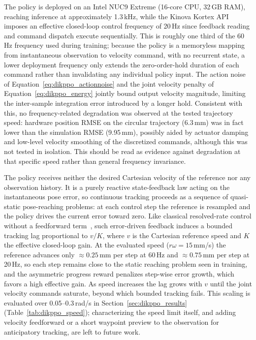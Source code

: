 The policy is deployed on an Intel NUC9 Extreme (16-core CPU, 32\,GB RAM), reaching inference at
approximately 1.3\,kHz, while the Kinova Kortex API imposes an effective closed-loop control
frequency of 20\,Hz since feedback reading and command dispatch execute sequentially. This is
roughly one third of the 60\,Hz frequency used during training; because the policy is a memoryless
mapping from instantaneous observation to velocity command, with no recurrent state, a lower
deployment frequency only extends the zero-order-hold duration of each command rather than
invalidating any individual policy input. The action noise of Equation~\eqref{eq:dikppo_actionnoise}
and the joint velocity penalty of Equation~\eqref{eq:dikppo_energy} jointly bound output velocity
magnitude, limiting the inter-sample integration error introduced by a longer hold. Consistent with
this, no frequency-related degradation was observed at the tested trajectory speed: hardware position
RMSE on the circular trajectory (6.3\,mm) was in fact lower than the simulation RMSE (9.95\,mm),
possibly aided by actuator damping and low-level velocity smoothing of the discretized commands,
although this was not tested in isolation. This should be read as evidence against degradation at
that specific speed rather than general frequency invariance.

The policy receives neither the desired Cartesian velocity of the reference nor any observation
history. It is a purely reactive state-feedback law acting on the instantaneous pose error, so
continuous tracking proceeds as a sequence of quasi-static pose-reaching problems: at each control
step the reference is resampled and the policy drives the current error toward zero. Like classical
resolved-rate control without a feedforward term~\citep{whitney1969resolved}, such error-driven
feedback induces a bounded tracking lag proportional to $v/K$, where $v$ is the Cartesian reference
speed and $K$ the effective closed-loop gain. At the evaluated speed ($r\omega = 15$\,mm/s) the
reference advances only $\approx 0.25$\,mm per step at 60\,Hz and $\approx 0.75$\,mm per step at
20\,Hz, so each step remains close to the static reaching problem seen in training, and the
asymmetric progress reward penalizes step-wise error growth, which favors a high effective gain. As
speed increases the lag grows with $v$ until the joint velocity commands saturate, beyond which
bounded tracking fails. This scaling is evaluated over 0.05--0.3\,rad/s in
Section~\ref{sec:dikppo_results} (Table~\ref{tab:dikppo_speed}); characterizing the speed limit
itself, and adding velocity feedforward or a short waypoint preview to the observation for
anticipatory tracking, are left to future work.


